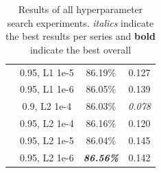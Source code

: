 {{\begin{table}[t]
\begin{tabular}{c|c|cc}
                 & 0.95, L1 1e-5  &      86.19\%               &   0.127                  \\
                 & 0.95, L1 1e-6                    &     86.05\%                &              0.139           \\
                 & 0.9, L2 1e-4                   &    86.03\%                 &      \emph{0.078}                   \\
                 & 0.95, L2 1e-4                   &     86.16\%                &      0.120                   \\
                 & 0.95, L2 1e-5                   &   86.04\%                  &      0.145                   \\
                 & 0.95, L2 1e-6                   &  \textbf{\emph{ 86.56\%}}                  &      0.142                   \\
    \bottomrule
    \end{tabular}
    \caption{Results of all hyperparameter search experiments. \emph{italics} indicate the best results per series and \textbf{bold} indicate the best overall}
    \label{tab:hp_search}
\end{table}
}
}

